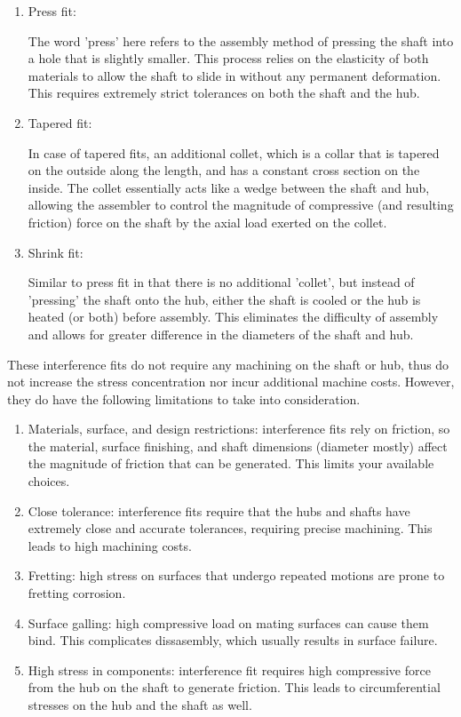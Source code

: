 \documentclass[a4paper,openany]{tufte-book}
\begin{document}
\begin{enumerate}
\item Press fit:

The word 'press' here refers to the assembly method of pressing the shaft into a hole that is slightly smaller. This process relies on the elasticity of both materials to allow the shaft to slide in without any permanent deformation. This requires extremely strict tolerances on both the shaft and the hub.

\item Tapered fit:

In case of tapered fits, an additional collet, which is a collar that is tapered on the outside along the length, and has a constant cross section on the inside. The collet essentially acts like a wedge between the shaft and hub, allowing the assembler to control the magnitude of compressive (and resulting friction) force on the shaft by the axial load exerted on the collet.

\item Shrink fit:

Similar to press fit in that there is no additional 'collet', but instead of 'pressing' the shaft onto the hub, either the shaft is cooled or the hub is heated (or both) before assembly. This eliminates the difficulty of assembly and allows for greater difference in the diameters of the shaft and hub.
\end{enumerate}

These interference fits do not require any machining on the shaft or hub, thus do not increase the stress concentration nor incur additional machine costs. However, they do have the following limitations to take into consideration.

\begin{enumerate}
\item Materials, surface, and design restrictions: interference fits rely on friction, so the material, surface finishing, and shaft dimensions (diameter mostly) affect the magnitude of friction that can be generated. This limits your available choices.

\item Close tolerance: interference fits require that the hubs and shafts have extremely close and accurate tolerances, requiring precise machining. This leads to high machining costs.

\item Fretting: high stress on surfaces that undergo repeated motions are prone to fretting corrosion.

\item Surface galling: high compressive load on mating surfaces can cause them bind. This complicates dissasembly, which usually results in surface failure.

\item High stress in components: interference fit requires high compressive force from the hub on the shaft to generate friction. This leads to circumferential stresses on the hub and the shaft as well.
\end{enumerate}
\end{document}
